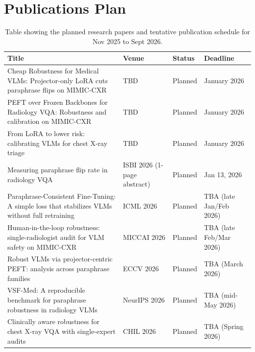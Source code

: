 \newpage
\section{Publications Plan}
\label{chapter:publication-plan}
\begin{table}[h]
\centering
\begin{tabular}{|p{}|p{}|p{}|p{}|}
\hline
\textbf{Title} & \textbf{Venue} & \textbf{Status} & \textbf{Deadline} \\
\hline
Cheap Robustness for Medical VLMs: Projector-only LoRA cuts paraphrase flips on MIMIC-CXR & TBD & Planned & January 2026 \\
\hline
PEFT over Frozen Backbones for Radiology VQA: Robustness and calibration on MIMIC-CXR & TBD & Planned & January 2026 \\
\hline
From LoRA to lower risk: calibrating VLMs for chest X-ray triage & TBD & Planned & January 2026 \\
\hline
Measuring paraphrase flip rate in radiology VQA & ISBI 2026 (1-page abstract) & Planned & Jan 13, 2026 \\
\hline
Paraphrase-Consistent Fine-Tuning: A simple loss that stabilizes VLMs without full retraining & ICML 2026 & Planned & TBA (late Jan/Feb 2026) \\
\hline
Human-in-the-loop robustness: single-radiologist audit for VLM safety on MIMIC-CXR & MICCAI 2026 & Planned & TBA (late Feb/Mar 2026) \\
\hline
Robust VLMs via projector-centric PEFT: analysis across paraphrase families & ECCV 2026 & Planned & TBA (March 2026) \\
\hline
VSF-Med: A reproducible benchmark for paraphrase robustness in radiology VLMs & NeurIPS 2026 & Planned & TBA (mid-May 2026) \\
\hline
Clinically aware robustness for chest X-ray VQA with single-expert audits & CHIL 2026 & Planned & TBA (Spring 2026) \\
\hline
\end{tabular}
\caption{Table showing the planned research papers and tentative publication schedule for Nov 2025 to Sept 2026.}
\label{tab:research-papers}
\end{table}



